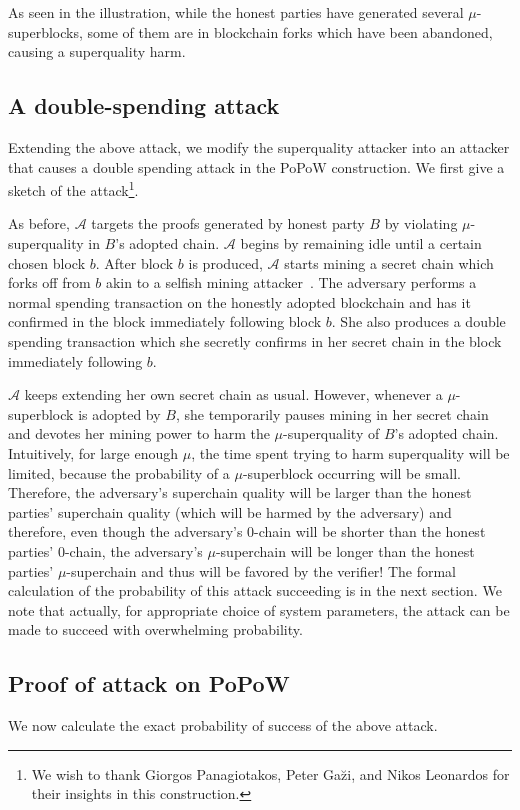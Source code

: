 As seen in the illustration, while the honest parties have generated several
$\mu$-superblocks, some of them are in blockchain forks which have been
abandoned, causing a superquality harm.

\subsection{A double-spending attack}
Extending the above attack, we modify the superquality attacker into an attacker
that causes a double spending attack in the PoPoW construction. We first give
a sketch of the attack\footnote{We wish to thank Giorgos Panagiotakos, Peter
Ga\u{z}i, and Nikos Leonardos for their insights in this construction.}.

As before, $\mathcal{A}$ targets the proofs generated by honest party $B$ by
violating $\mu$-superquality in $B$'s adopted chain. $\mathcal{A}$ begins by
remaining idle until a certain chosen block $b$. After block $b$ is produced,
$\mathcal{A}$ starts mining a secret chain which forks off from $b$ akin to a
selfish mining attacker~\cite{selfish}. The adversary performs a normal spending
transaction on the honestly adopted blockchain and has it confirmed in the block
immediately following block $b$. She also produces a double spending transaction
which she secretly confirms in her secret chain in the block immediately
following $b$.

$\mathcal{A}$ keeps extending her own secret chain as usual. However, whenever a
$\mu$-superblock is adopted by $B$, she temporarily pauses mining in her secret
chain and devotes her mining power to harm the $\mu$-superquality of $B$'s
adopted chain. Intuitively, for large enough $\mu$, the time spent trying to
harm superquality will be limited, because the probability of a $\mu$-superblock
occurring will be small. Therefore, the adversary's superchain quality will be
larger than the honest parties' superchain quality (which will be harmed by the
adversary) and therefore, even though the adversary's $0$-chain will be shorter
than the honest parties' $0$-chain, the adversary's $\mu$-superchain will be
longer than the honest parties' $\mu$-superchain and thus will be favored by the
verifier! The formal calculation of the probability of this attack succeeding is
in the next section. We note that actually, for appropriate choice of system
parameters, the attack can be made to succeed with overwhelming probability.

\subsection{Proof of attack on PoPoW}
\label{sec:attack-full}
We now calculate the exact probability of success of the above attack.

